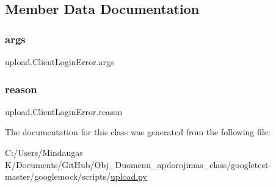 \subsection{Member Data Documentation}
\mbox{\label{classupload_1_1_client_login_error_ac300a0b034b2bc64cedc51e09fb6d663}} 
\subsubsection{\texorpdfstring{args}{args}}
{\footnotesize\ttfamily upload.\+Client\+Login\+Error.\+args}

\mbox{\label{classupload_1_1_client_login_error_ae0555feb182d89d1e4d7944afbfe14e5}} 
\subsubsection{\texorpdfstring{reason}{reason}}
{\footnotesize\ttfamily upload.\+Client\+Login\+Error.\+reason}



The documentation for this class was generated from the following file\+:\begin{DoxyCompactItemize}
\item 
C\+:/\+Users/\+Mindaugas K/\+Documents/\+Git\+Hub/\+Obj\+\_\+\+Duomenu\+\_\+apdorojimas\+\_\+class/googletest-\/master/googlemock/scripts/\mbox{\hyperlink{googletest-master_2googlemock_2scripts_2upload_8py}{upload.\+py}}\end{DoxyCompactItemize}
